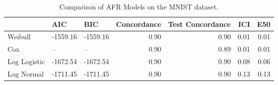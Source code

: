 \begin{table*}
\centering
\caption{Comparison of AFR Models on the MNIST dataset.}
\label{tab:mnist}
\begin{tabular}{lllrrrr}
\toprule
 & AIC & BIC & Concordance & Test Concordance & ICI & E50 \\
\midrule
Weibull & -1559.16 & -1559.16 & 0.90 & 0.90 & 0.01 & 0.01 \\
Cox & -- & -- & 0.90 & 0.89 & 0.01 & 0.01 \\
Log Logistic & -1672.54 & -1672.54 & 0.90 & 0.90 & 0.08 & 0.06 \\
Log Normal & -1711.45 & -1711.45 & 0.90 & 0.90 & 0.13 & 0.13 \\
\bottomrule
\end{tabular}
\end{table*}
